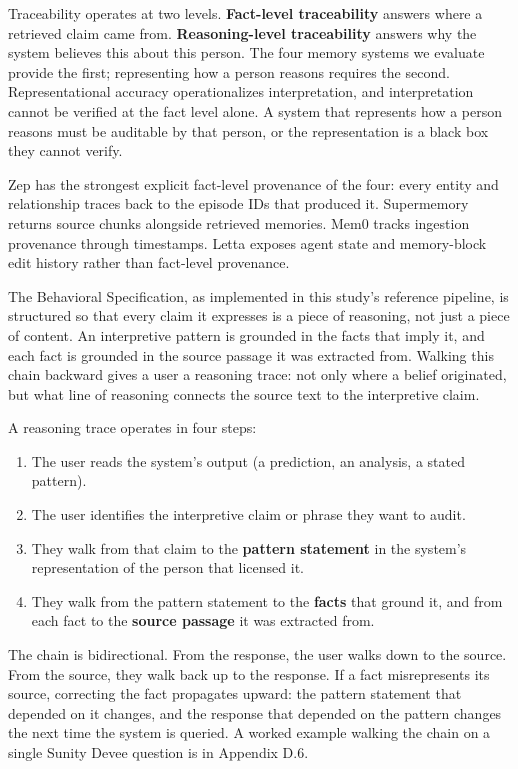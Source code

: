Traceability operates at two levels. \textbf{Fact-level traceability}
answers where a retrieved claim came from. \textbf{Reasoning-level
traceability} answers why the system believes this about this person.
The four memory systems we evaluate provide the first; representing how
a person reasons requires the second. Representational accuracy
operationalizes interpretation, and interpretation cannot be verified at
the fact level alone. A system that represents how a person reasons must
be auditable by that person, or the representation is a black box they
cannot verify.

Zep has the strongest explicit fact-level provenance of the four: every
entity and relationship traces back to the episode IDs that produced it.
Supermemory returns source chunks alongside retrieved memories. Mem0
tracks ingestion provenance through timestamps. Letta exposes agent
state and memory-block edit history rather than fact-level provenance.

The Behavioral Specification, as implemented in this study's reference
pipeline, is structured so that every claim it expresses is a piece of
reasoning, not just a piece of content. An interpretive pattern is
grounded in the facts that imply it, and each fact is grounded in the
source passage it was extracted from. Walking this chain backward gives
a user a reasoning trace: not only where a belief originated, but what
line of reasoning connects the source text to the interpretive claim.

A reasoning trace operates in four steps:

\begin{enumerate}
\def\labelenumi{\arabic{enumi}.}
\tightlist
\item
  The user reads the system's output (a prediction, an analysis, a
  stated pattern).
\item
  The user identifies the interpretive claim or phrase they want to
  audit.
\item
  They walk from that claim to the \textbf{pattern statement} in the
  system's representation of the person that licensed it.
\item
  They walk from the pattern statement to the \textbf{facts} that ground
  it, and from each fact to the \textbf{source passage} it was extracted
  from.
\end{enumerate}

The chain is bidirectional. From the response, the user walks down to
the source. From the source, they walk back up to the response. If a
fact misrepresents its source, correcting the fact propagates upward:
the pattern statement that depended on it changes, and the response that
depended on the pattern changes the next time the system is queried. A
worked example walking the chain on a single Sunity Devee question is in
Appendix D.6.

